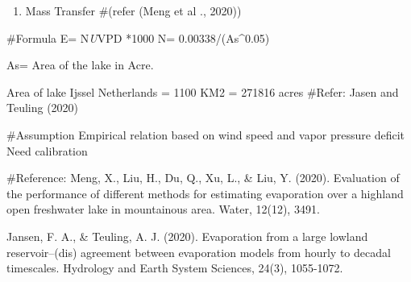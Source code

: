 \documentclass[
]{article}
\newenvironment{Shaded}{\begin{snugshade}}{\end{snugshade}}
\newcommand{\CommentTok}[1]{\textcolor[rgb]{0.56,0.35,0.01}{\textit{#1}}}
\newcommand{\DecValTok}[1]{\textcolor[rgb]{0.00,0.00,0.81}{#1}}
\newcommand{\FloatTok}[1]{\textcolor[rgb]{0.00,0.00,0.81}{#1}}
\newcommand{\NormalTok}[1]{#1}
\newcommand{\OtherTok}[1]{\textcolor[rgb]{0.56,0.35,0.01}{#1}}
\newcommand{\SpecialCharTok}[1]{\textcolor[rgb]{0.00,0.00,0.00}{#1}}
\providecommand{\tightlist}{%
  \setlength{\itemsep}{0pt}\setlength{\parskip}{0pt}}
\begin{document}
\begin{Shaded}
\end{Shaded}

\begin{enumerate}
\def\labelenumi{\arabic{enumi}.}
\setcounter{enumi}{9}
\tightlist
\item
  Mass Transfer \#(refer (Meng et al ., 2020))
\end{enumerate}

\#Formula E= N\emph{U}VPD *1000 N= 0.00338/(As\^{}0.05)

As= Area of the lake in Acre.

Area of lake Ijssel Netherlands = 1100 KM2 = 271816 acres \#Refer: Jasen
and Teuling (2020)

\#Assumption Empirical relation based on wind speed and vapor pressure
deficit Need calibration

\#Reference: Meng, X., Liu, H., Du, Q., Xu, L., \& Liu, Y. (2020).
Evaluation of the performance of different methods for estimating
evaporation over a highland open freshwater lake in mountainous area.
Water, 12(12), 3491.

Jansen, F. A., \& Teuling, A. J. (2020). Evaporation from a large
lowland reservoir--(dis) agreement between evaporation models from
hourly to decadal timescales. Hydrology and Earth System Sciences,
24(3), 1055-1072.
\end{document}
